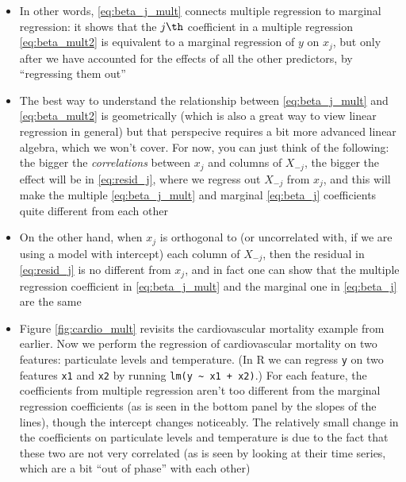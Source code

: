 \documentclass{article}
\begin{document}
\begin{itemize}
\item In other words, \eqref{eq:beta_j_mult} connects multiple regression to
  marginal regression: it shows that the $j\th$ coefficient in a multiple
  regression \eqref{eq:beta_mult2} is equivalent to a marginal regression of $y$
  on $x_j$, but only after we have accounted for the effects of all the other
  predictors, by ``regressing them out'' 

\item The best way to understand the relationship between \eqref{eq:beta_j_mult}
  and \eqref{eq:beta_mult2} is geometrically (which is also a great way to view 
  linear regression in general) but that perspecive requires a bit more advanced
  linear algebra, which we won't cover. For now, you can just think of the
  following: the bigger the \emph{correlations} between $x_j$ and columns of
  $X_{-j}$, the bigger the effect will be in \eqref{eq:resid_j}, where we
  regress out $X_{-j}$ from $x_j$, and this will make the multiple
  \eqref{eq:beta_j_mult} and marginal \eqref{eq:beta_j} coefficients quite 
  different from each other

\item On the other hand, when $x_j$ is orthogonal to (or uncorrelated with, if
  we are using a model with intercept) each column of $X_{-j}$, then the
  residual  in \eqref{eq:resid_j} is no different from
  $x_j$, and in fact one can show that the multiple regression coefficient in
  \eqref{eq:beta_j_mult} and the marginal one in \eqref{eq:beta_j} are the same    

\item Figure \ref{fig:cardio_mult} revisits the cardiovascular mortality example
  from earlier. Now we perform the regression of cardiovascular mortality on two
  features: particulate levels and temperature. (In R we can regress \verb|y| on
  two features \verb|x1| and \verb|x2| by running \verb|lm(y ~ x1 + x2)|.) For
  each feature, the coefficients from multiple regression aren't too different
  from the marginal regression coefficients (as is seen in the bottom panel by
  the slopes of the lines), though the intercept changes noticeably. The 
  relatively small change in the coefficients on particulate levels and
  temperature is due to the fact that these two are not very correlated (as is
  seen by looking at their time series, which are a bit ``out of phase'' with
  each other) 


\end{itemize}
\end{document}
